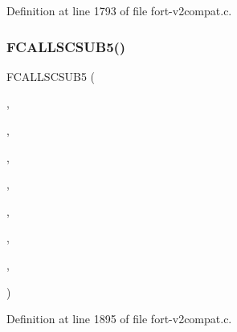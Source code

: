 Definition at line 1793 of file fort-\/v2compat.\+c.

\mbox{\label{fort-v2compat_8c_a8bd30481b6c02713c36110489bc583c3}} 
\subsubsection{\texorpdfstring{F\+C\+A\+L\+L\+S\+C\+S\+U\+B5()}{FCALLSCSUB5()}\hspace{0.1cm}{\footnotesize\ttfamily [7/8]}}
{\footnotesize\ttfamily F\+C\+A\+L\+L\+S\+C\+S\+U\+B5 (\begin{DoxyParamCaption}\item[{\hyperlink{nf__v2compat_8c_aeeeb1daf5d2fbc85f3d7135d723e6198}{c\+\_\+ncanam}}]{,  }\item[{N\+C\+A\+N\+AM}]{,  }\item[{\hyperlink{nf__fortv2_8f90_abd5c8126f5ad1171b3944262956899b0}{ncanam}}]{,  }\item[{N\+C\+ID}]{,  }\item[{V\+A\+R\+ID}]{,  }\item[{\hyperlink{ncfortran_8h_a01d1fad6578e98ab92205f3da4b446dc}{A\+T\+T\+ID}}]{,  }\item[{P\+S\+T\+R\+I\+NG}]{,  }\item[{\hyperlink{fort-v2compat_8c_ae2352f39cbd25bcaf1bedbbb12db73fe}{P\+R\+C\+O\+DE}}]{ }\end{DoxyParamCaption})}



Definition at line 1895 of file fort-\/v2compat.\+c.

\mbox{\label{fort-v2compat_8c_ae0df920cf268e71f8e48aca0a84b25c7}} 
